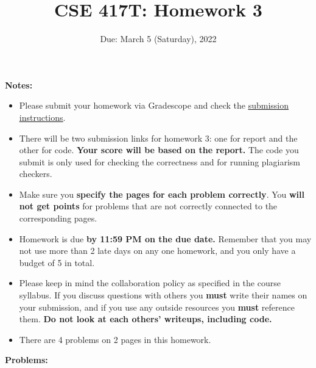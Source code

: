 \documentclass[11pt]{article}
\begin{document}
\title{CSE 417T: Homework 3}
\date{Due: March 5 (Saturday), 2022}

\vspace{-20pt}
\maketitle

\noindent \textbf{Notes: } 
\begin{itemize}

\item Please submit your homework via Gradescope and check the \href{http://chienjuho.com/courses/cse417t/hw_instructions.html}{\underline{submission instructions}}.

\vspace{-5pt}
\item There will be two submission links for homework 3: one for report and the other for code. \textbf{Your score will be based on the report.} The code you submit is only used for checking the correctness and for running plagiarism checkers.

\vspace{-5pt}
\item Make sure you \textbf{specify the pages for each problem correctly}. You \textbf{will not get points} for problems that are not correctly connected to the corresponding pages.

\vspace{-5pt}
\item Homework is due \textbf{by 11:59 PM on the due date.} Remember that
  you may not use more than 2 late days on any one homework, and you
  only have a budget of 5 in total.

\vspace{-5pt}
\item Please keep in mind the collaboration policy as specified in the
  course syllabus. If you discuss questions with 
others you \textbf{must} write their names on your submission, and if
you use any outside resources you \textbf{must} reference
them. \textbf{Do not look at each others' writeups, including code.}

\vspace{-5pt}
\item There are 4 problems on 2 pages in this homework. 

\end{itemize}

\noindent \textbf{Problems:}
\end{document}
